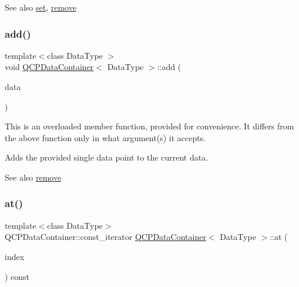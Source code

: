 \begin{DoxySeeAlso}{See also}
\hyperlink{classQCPDataContainer_ae7042bd534fc3ce7befa2ce3f790b5bf}{set}, \hyperlink{classQCPDataContainer_ae5f569a120648b167efa78835f12fd38}{remove} 
\end{DoxySeeAlso}
\mbox{\label{classQCPDataContainer_a715e8e9972466804954a2f8fbd5288b7}} 
\subsubsection{\texorpdfstring{add()}{add()}\hspace{0.1cm}{\footnotesize\ttfamily [3/3]}}
{\footnotesize\ttfamily template$<$class Data\+Type $>$ \\
void \hyperlink{classQCPDataContainer}{Q\+C\+P\+Data\+Container}$<$ Data\+Type $>$\+::add (\begin{DoxyParamCaption}\item[{const Data\+Type \&}]{data }\end{DoxyParamCaption})}

This is an overloaded member function, provided for convenience. It differs from the above function only in what argument(s) it accepts.

Adds the provided single data point to the current data.

\begin{DoxySeeAlso}{See also}
\hyperlink{classQCPDataContainer_ae5f569a120648b167efa78835f12fd38}{remove} 
\end{DoxySeeAlso}
\mbox{\label{classQCPDataContainer_ae90c7457a052b223539906e6bddc0a92}} 
\subsubsection{\texorpdfstring{at()}{at()}}
{\footnotesize\ttfamily template$<$class Data\+Type$>$ \\
Q\+C\+P\+Data\+Container\+::const\+\_\+iterator \hyperlink{classQCPDataContainer}{Q\+C\+P\+Data\+Container}$<$ Data\+Type $>$\+::at (\begin{DoxyParamCaption}\item[{int}]{index }\end{DoxyParamCaption}) const\hspace{0.3cm}{\ttfamily [inline]}}

